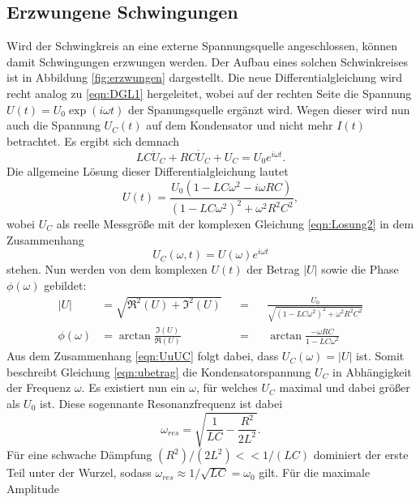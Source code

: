 \subsection{Erzwungene Schwingungen}
Wird der Schwingkreis an eine externe Spannungsquelle angeschlossen, können damit Schwingungen erzwungen werden. Der Aufbau eines solchen Schwinkreises
ist in Abbildung \ref{fig:erzwungen} dargestellt. Die neue Differentialgleichung wird recht analog zu \eqref{eqn:DGL1} hergeleitet, wobei auf der 
rechten Seite die Spannung $U(t)=U_0\exp(i\omega t)$ der Spanungsquelle ergänzt wird. Wegen dieser wird nun auch die Spannung $U_C(t)$ auf dem Kondensator
 und nicht mehr $I(t)$ betrachtet. Es ergibt sich demnach
\begin{equation}
    LC\ddot{U}_C+RC\dot{U}_C+U_C=U_0e^{i\omega t}   .
    \label{eqn:DGL2}
\end{equation}
Die allgemeine Lösung dieser Differentialgleichung lautet
\begin{equation}
    U(t)=\frac{U_0(1-LC\omega^2-i\omega RC)}{(1-LC\omega^2)^2+\omega^2R^2C^2}   ,
    \label{eqn:Losung2}
\end{equation}
wobei $U_C$ als reelle Messgröße mit der komplexen Gleichung \eqref{eqn:Losung2} in dem Zusammenhang
\begin{equation}
    U_C(\omega,t)=U(\omega)e^{i\omega t} \label{eqn:UuUC}
\end{equation} 
stehen. Nun werden von dem komplexen $U(t)$ der Betrag $|U|$ sowie die Phase $\phi(\omega)$ gebildet:
\begin{align} %
    |U|          &= \sqrt{\Re^2(U)+\Im^2(U)}      & &=& &\frac{U_0}{\sqrt{(1-LC\omega^2)^2+\omega^2R^2C^2}} \label{eqn:ubetrag} \\
    \phi(\omega) &= \arctan{\frac{\Im(U)}{\Re(U)}}& &=& &\arctan{\frac{-\omega RC}{1-LC\omega^2}} \label{eqn:uphase}
\end{align}
Aus dem Zusammenhang \eqref{eqn:UuUC} folgt dabei, dass $U_C(\omega)=|U|$ ist. Somit beschreibt Gleichung \eqref{eqn:ubetrag} die Kondensatorspannung
$U_C$ in Abhängigkeit der Frequenz $\omega$. Es existiert nun ein $\omega$, für welches $U_C$ maximal und dabei größer als $U_0$ ist. Diese 
sogennante Resonanzfrequenz ist dabei 
\begin{equation*}
    \omega_{res}=\sqrt{\frac{1}{LC}-\frac{R^2}{2L^2}}   .
\end{equation*}
Für eine schwache Dämpfung $(R^2)/(2L^2)<<1/(LC)$ dominiert der erste Teil unter der Wurzel, sodass $\omega_{res}\approx 1/\sqrt{LC}=\omega_0$ gilt. Für die maximale Amplitude
